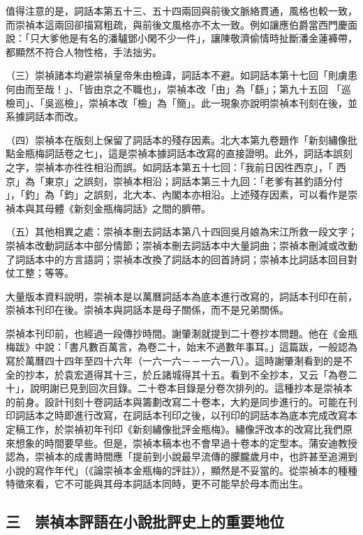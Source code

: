 值得注意的是，詞話本第五十三、五十四兩回與前後文脈絡貫通，風格也較一致，而崇禎本這兩回卻描寫粗疏，與前後文風格亦不太一致。例如讓應伯爵當西門慶面說：「只大爹他是有名的潘驢鄧小閑不少一件」，讓陳敬濟偷情時扯斷潘金蓮褲帶，都顯然不符合人物性格，手法拙劣。

（三）崇禎諸本均避崇禎皇帝朱由檢諱，詞話本不避。如詞話本第十七回「則虜患何由而至哉！」、「皆由京之不職也」，崇禎本改「由」為「繇」；第九十五回 「巡檢司」、「吳巡檢」，崇禎本改「檢」為「簡」。此一現象亦說明崇禎本刊刻在後，並系據詞話本而改。

（四）崇禎本在版刻上保留了詞話本的殘存因素。北大本第九卷題作「新刻繡像批點金瓶梅詞話卷之七」，這是崇禎本據詞話本改寫的直接證明。此外，詞話本誤刻之字，崇禎本亦徃徃相沿而誤。如詞話本第五十七回：「我前日因徃西京」，「 西京」為「東京」之誤刻，崇禎本相沿；詞話本第三十九回：「老爹有甚釣語分付 」，「釣」為「鈞」之誤刻，北大本、內閣本亦相沿。上述殘存因素，可以看作是崇禎本與其母體《新刻金瓶梅詞話》之間的臍帶。

（五）其他相異之處：崇禎本刪去詞話本第八十四回吳月娘為宋江所救一段文字；崇禎本改動詞話本中部分情節；崇禎本刪去詞話本中大量詞曲；崇禎本刪減或改動了詞話本中的方言語詞；崇禎本改換了詞話本的回首詩詞；崇禎本比詞話本回目對仗工整；等等。

大量版本資料說明，崇禎本是以萬曆詞話本為底本進行改寫的，詞話本刊印在前，崇禎本刊印在後。崇禎本與詞話本是母子關係，而不是兄弟關係。

崇禎本刊印前，也經過一段傳抄時間。謝肇淛就提到二十卷抄本問題。他在《金瓶梅跋》中說：「書凡數百萬言，為卷二十，始末不過數年事耳。」這篇跋，一般認為寫於萬曆四十四年至四十六年（一六一六－－一六一八）。這時謝肇淛看到的是不全的抄本，於袁宏道得其十三，於丘諸城得其十五。看到不全抄本，又云「為卷二十」，說明謝已見到回次目錄。二十卷本目錄是分卷次排列的。這種抄本是崇禎本的前身。設計刊刻十卷詞話本與籌劃改寫二十卷本，大約是同步進行的。可能在刊印詞話本之時即進行改寫，在詞話本刊印之後，以刊印的詞話本為底本完成改寫本定稿工作，於崇禎初年刊印《新刻繡像批評金瓶梅》。繡像評改本的改寫比我們原來想象的時間要早些。但是，崇禎本稿本也不會早過十卷本的定型本。蒲安迪教授認為，崇禎本的成書時間應「提前到小說最早流傳的朦朧歲月中，也許甚至追溯到小說的寫作年代」（《論崇禎本金瓶梅的評註》），顯然是不妥當的。從崇禎本的種種特徵來看，它不可能與其母本詞話本同時，更不可能早於母本而出生。

\subsection*{三　崇禎本評語在小說批評史上的重要地位}

